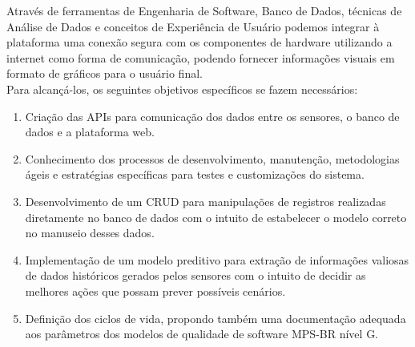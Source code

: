 \documentclass[tcc-proposta]{texufpel}
\begin{document}
Através de ferramentas de Engenharia de Software, Banco de Dados, técnicas de Análise de Dados e conceitos de Experiência de Usuário podemos integrar à plataforma uma conexão segura com os componentes de hardware utilizando a internet como forma de comunicação, podendo fornecer informações visuais em formato de gráficos para o usuário final.
\\

Para alcançá-los, os seguintes objetivos específicos se fazem necessários:
\begin{enumerate}

\item Criação das APIs para comunicação dos dados entre os sensores, o banco de dados e a plataforma web.
\item Conhecimento dos processos de desenvolvimento, manutenção, metodologias ágeis e estratégias específicas para testes e customizações do sistema.
\item Desenvolvimento de um CRUD para manipulações de registros realizadas diretamente no banco de dados com o intuito de estabelecer o modelo correto no manuseio desses dados.
\item Implementação de um modelo preditivo para extração de informações valiosas de dados históricos gerados pelos sensores com o intuito de decidir as melhores ações que possam prever possíveis cenários.
\item Definição dos ciclos de vida, propondo também uma documentação adequada aos parâmetros dos modelos de qualidade de software MPS-BR nível G.
\end{enumerate}







\end{document}
